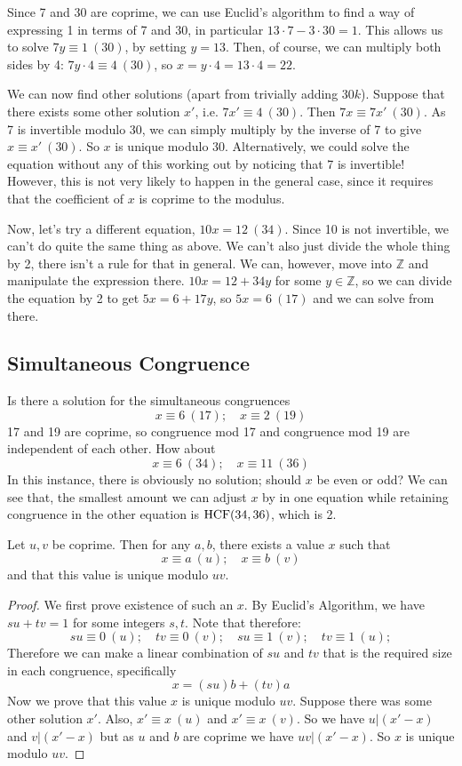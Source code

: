 \documentclass{article}
\begin{document}
	Since 7 and 30 are coprime, we can use Euclid's algorithm to find a way of expressing 1 in terms of 7 and 30, in particular $13 \cdot 7 - 3\cdot 30 = 1$. This allows us to solve $7y \equiv 1\ (30)$, by setting $y=13$. Then, of course, we can multiply both sides by 4: $7 y\cdot 4 \equiv 4\ (30)$, so $x = y \cdot 4 = 13 \cdot 4 = 22$.
	
	We can now find other solutions (apart from trivially adding $30k$). Suppose that there exists some other solution $x'$, i.e. $7x' \equiv 4\ (30)$. Then $7x \equiv 7x'\ (30)$. As 7 is invertible modulo 30, we can simply multiply by the inverse of 7 to give $x \equiv x'\ (30)$. So $x$ is unique modulo 30. Alternatively, we could solve the equation without any of this working out by noticing that 7 is invertible! However, this is not very likely to happen in the general case, since it requires that the coefficient of $x$ is coprime to the modulus.
	
	Now, let's try a different equation, $10x = 12\ (34)$. Since 10 is not invertible, we can't do quite the same thing as above. We can't also just divide the whole thing by 2, there isn't a rule for that in general. We can, however, move into $\mathbb Z$ and manipulate the expression there. $10x = 12 + 34y$ for some $y \in \mathbb Z$, so we can divide the equation by 2 to get $5x = 6 + 17y$, so $5x = 6\ (17)$ and we can solve from there.
	
	\subsection{Simultaneous Congruence}
	Is there a solution for the simultaneous congruences
	\[ x \equiv 6\ (17);\quad x \equiv 2\ (19) \]
	17 and 19 are coprime, so congruence mod 17 and congruence mod 19 are independent of each other. How about
	\[ x \equiv 6\ (34);\quad x \equiv 11\ (36) \]
	In this instance, there is obviously no solution; should $x$ be even or odd? We can see that, the smallest amount we can adjust $x$ by in one equation while retaining congruence in the other equation is $\operatorname{HCF}(34, 36)$, which is 2.
	\begin{theorem}
		Let $u, v$ be coprime. Then for any $a, b$, there exists a value $x$ such that
		\[ x \equiv a\ (u);\quad x \equiv b\ (v) \]
		and that this value is unique modulo $uv$.
	\end{theorem}
	\begin{proof}
		We first prove existence of such an $x$. By Euclid's Algorithm, we have $su + tv = 1$ for some integers $s, t$. Note that therefore:
		\[ su \equiv 0\ (u);\quad tv \equiv 0\ (v);\quad su \equiv 1\ (v);\quad tv \equiv 1\ (u); \]
		Therefore we can make a linear combination of $su$ and $tv$ that is the required size in each congruence, specifically
		\[ x = (su)b + (tv)a \]
		Now we prove that this value $x$ is unique modulo $uv$. Suppose there was some other solution $x'$. Also, $x' \equiv x\ (u)$ and $x' \equiv x\ (v)$. So we have $u|(x' - x)$ and $v|(x' - x)$ but as $u$ and $b$ are coprime we have $uv|(x' - x)$. So $x$ is unique modulo $uv$.
	\end{proof}
\end{document}

